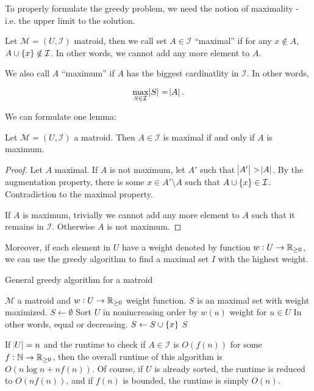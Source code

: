 To properly formulate the greedy problem, we need the notion of maximality - i.e. the upper limit to the solution. 

\begin{define}
    Let $\mathcal{M}=(U, \mathcal{I})$ matroid, then we call set $A \in \mathcal{I}$ ``maximal'' if for any $x \notin A$, $A \cup \cbr{x} \notin \mathcal{I}$. In other words, we cannot add any more element to $A$. 

    We also call $A$ ``maximum'' if $A$ has the biggest cardinatlity in $\mathcal{I}$. In other words, 

    \[
        \max_{S \in \mathcal{I}} \abs{S} = \abs{A}. 
    \]
\end{define}

We can formulate one lemma:

\begin{lemma}
    Let $\mathcal{M}=(U,\mathcal{I})$ a matroid. 
    Then $A \in \mathcal{I}$ is maximal if and only if $A$ is maximum. 
\end{lemma}

\begin{proof}
    \toquotation Let $A$ maximal. If $A$ is not maximum, let $A'$ such that $\abs{A'} > \abs{A}$. 
    By the augmentation property, there is some $x \in A' \setminus A$ such that $A \cup \cbr{x} \in \mathcal{I}$. 
    Contradiction to the maximal property.

    \fromquotation If $A$ is maximum, trivially we cannot add any more element to $A$ such that it remains in $\mathcal{I}$. Otherwise $A$ is not maximum. 
\end{proof}

Moreover, if each element in $U$ have a weight denoted by function $w: U \to \mathbb{{R}}_{\ge 0}$, we can use the greedy algorithm to find a maximal set $I$ with the highest weight.

\begin{algorithm}[H]
\caption{General greedy algorithm for a matroid}
\label{greedy-matroid}
\begin{algorithmic}[1]
    \Require $\mathcal{M}$ a matroid and $w: U \to \mathbb{{R}}_{\ge 0}$ weight function. 
    \Ensure $S$ is an maximal set with weight maximized. 
        \State $S \gets \emptyset$
        \State Sort $U$ in nonincreasing order by $w(u)$ weight for $u \in U$ \Comment In other words, equal or decreasing.
                \State $S \gets S \cup \cbr{x}$
            \EndIf
        \EndFor
        \State \Return $S$ 
    \EndFunction
\end{algorithmic}
\end{algorithm}

If $\abs{U}=n$ and the runtime to check if $A \in \mathcal{I}$ is $O(f(n))$ for some $f: \mathbb{N} \to \mathbb{{R}}_{\ge 0}$, then the overall runtime of this algorithm is $O(n\log n + nf(n))$. 
Of course, if $U$ is already sorted, the runtime is reduced to $O(nf(n))$, and if $f(n)$ is bounded, the runtime is simply $O(n)$. 